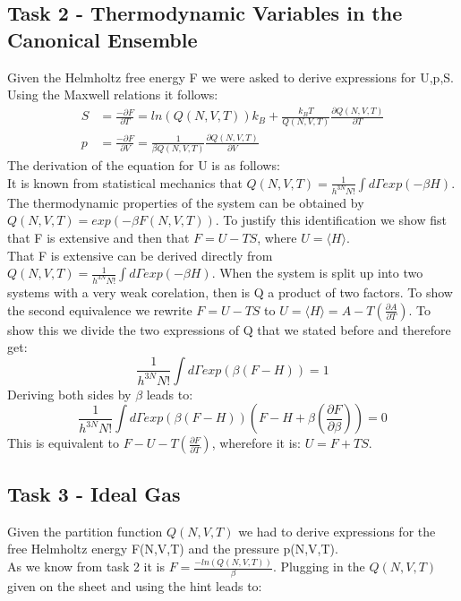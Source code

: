\documentclass[12pt,a4paper]{scrartcl}
\begin{document}
\subsection{Task 2 - Thermodynamic Variables in the Canonical Ensemble}
Given the Helmholtz free energy F we were asked to derive expressions for U,p,S.
Using the Maxwell relations it follows:\\
\begin{align}
S&=\frac{-\partial F}{\partial T} = ln(Q(N,V,T))k_B+\frac{k_BT}{Q(N,V,T)}\frac{\partial Q(N,V,T)}{\partial T}\nonumber\\
p&=\frac{-\partial F}{\partial V}=\frac{1}{\beta Q(N,V,T)}\frac{\partial Q(N,V,T)}{\partial V}\nonumber
\end{align}
\newpage
The derivation of the equation for U is as follows:\\
It is known from statistical mechanics that $Q(N,V,T)= \frac{1}{h^{3N}N!}\int d\Gamma exp(-\beta H)$. The thermodynamic properties of the system can be obtained by $Q(N,V,T)=exp(-\beta F(N,V,T))$. To justify this identification we show fist that F is extensive and then that $F=U-TS$, where $U=\langle H \rangle$.\\
That F is extensive can be derived directly from $Q(N,V,T)= \frac{1}{h^{3N}N!}\int d\Gamma exp(-\beta H)$. When the system is split up into two systems with a very weak corelation, then is Q a product of two factors.
To show the second equivalence we rewrite $F = U -TS $ to $U = \langle H \rangle = A - T\left(\frac{\partial A}{\partial T} \right)$.
To show this we divide the two expressions of Q that we stated before and therefore get:\\
\[\frac{1}{h^{3N}N!}\int d\Gamma exp(\beta (F-H))=1\]
Deriving both sides by $\beta$ leads to:\\
\[ \frac{1}{h^{3N}N!}\int d\Gamma exp(\beta (F-H))(F-H+\beta \left(\frac{\partial F}{\partial \beta}\right))=0\]
This is equivalent to $F - U - T \left(\frac{\partial F}{\partial T}\right)$, wherefore it is: $U= F+TS$.

\subsection{Task 3 - Ideal Gas}
Given the partition function $Q(N,V,T)$ we had to derive expressions for the free Helmholtz energy F(N,V,T) and the pressure p(N,V,T).\\
As we know from task 2 it is $F=\frac{-ln(Q(N,V,T))}{\beta}$.
Plugging in the $Q(N,V,T)$ given on the sheet and using the hint leads to:
\end{document}
